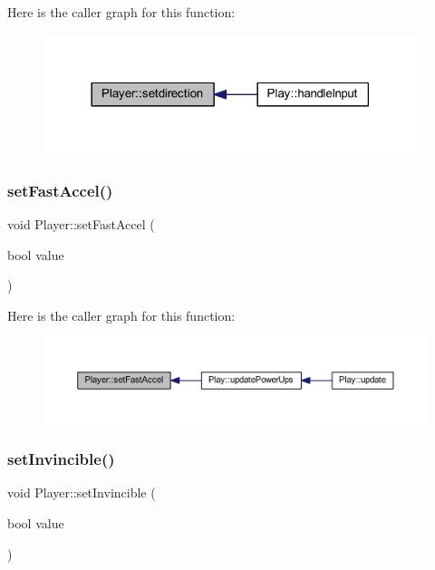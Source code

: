 Here is the caller graph for this function\+:
\nopagebreak
\begin{figure}[H]
\begin{center}
\leavevmode
\includegraphics[width=309pt]{class_player_a002f775383954913c852beedca3a2258_icgraph}
\end{center}
\end{figure}
\mbox{\label{class_player_ac35450b46e8c7555d8098002898a6daa}} 
\subsubsection{\texorpdfstring{set\+Fast\+Accel()}{setFastAccel()}}
{\footnotesize\ttfamily void Player\+::set\+Fast\+Accel (\begin{DoxyParamCaption}\item[{bool}]{value }\end{DoxyParamCaption})}

Here is the caller graph for this function\+:
\nopagebreak
\begin{figure}[H]
\begin{center}
\leavevmode
\includegraphics[width=350pt]{class_player_ac35450b46e8c7555d8098002898a6daa_icgraph}
\end{center}
\end{figure}
\mbox{\label{class_player_a796610d4bf49196f261a82f5b2c0a044}} 
\subsubsection{\texorpdfstring{set\+Invincible()}{setInvincible()}}
{\footnotesize\ttfamily void Player\+::set\+Invincible (\begin{DoxyParamCaption}\item[{bool}]{value }\end{DoxyParamCaption})}

